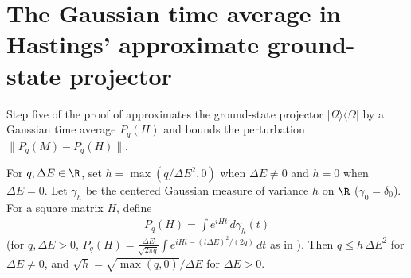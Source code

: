 \section{The Gaussian time average in Hastings' approximate ground-state projector}
\label{sec:hastings_gaussian_time_average}


Step five of the proof of \cite[Lemma~1]{Hastings2007AreaLaw} approximates the
ground-state projector $|\Omega\rangle\langle\Omega|$ by a Gaussian time average
$P_q(H)$ and bounds the perturbation $\|P_q(M)-P_q(H)\|$.

\begin{definition}
    \label{def:hastings_gaussian_time_average}
    \leanok
    For $q,\Delta E\in\R$, set $h=\max(q/\Delta E^2,0)$ when $\Delta E\ne0$ and
    $h=0$ when $\Delta E=0$. Let $\gamma_h$ be the centered Gaussian measure of
    variance $h$ on $\R$ ($\gamma_0=\delta_0$). For a square matrix $H$, define
    \begin{align}
        P_q(H)=\int e^{iHt}\,d\gamma_h(t)
        \label{eq:hastings_gaussian_time_average}
    \end{align}
    (for $q,\Delta E>0$,
    $P_q(H)=\frac{\Delta E}{\sqrt{2\pi q}}\int e^{iHt-(t\Delta E)^2/(2q)}\,dt$
    as in \cite[lines 843--847]{Hastings2007AreaLaw}). Then $q\le h\,\Delta E^2$
    for $\Delta E\ne0$, and $\sqrt h=\sqrt{\max(q,0)}/\Delta E$ for $\Delta E>0$.
\end{definition}

